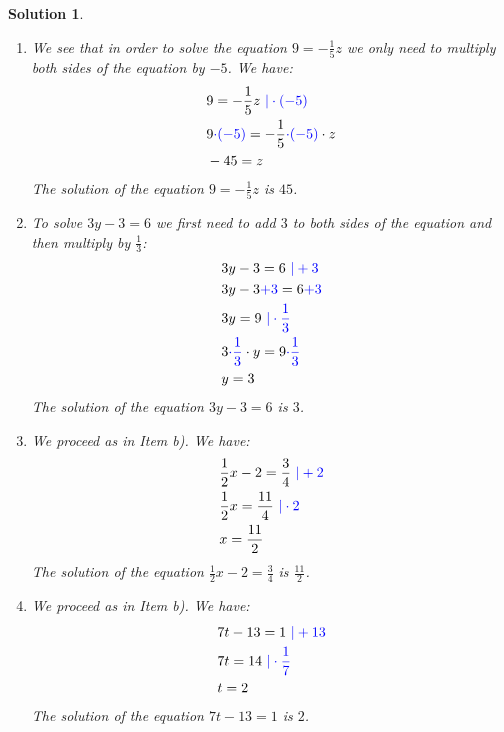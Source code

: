 \documentclass[12pt]{article}
\newtheorem{sol}[prop]{Solution}
\begin{document}
\begin{sol}
\begin{enumerate}
\item[a)] We see that in order to solve the equation $9=-\frac{1}{5}z$ we only need to multiply both sides of the equation by $-5$. We have:
\begin{equation*}
\begin{split}
& 9=-\frac{1}{5}z \textcolor{blue}{\ | \cdot (-5)}\\
& 9\textcolor{blue}{\cdot (-5)}=-\frac{1}{5}\textcolor{blue}{\cdot (-5)}\cdot z\\
& -45=z
\end{split}
\end{equation*}
The solution of the equation $9=-\frac{1}{5}z$ is $45$.
\item[b)] To solve $3y-3=6$ we first need to add $3$ to both sides of the equation and then multiply by $\frac{1}{3}$:
\begin{equation*}
\begin{split}
& 3y-3=6 \textcolor{blue}{\ | +3}\\
& 3y-3\textcolor{blue}{+3}=6\textcolor{blue}{+3}\\
& 3y=9\textcolor{blue}{\ | \cdot\frac{1}{3}}\\
& 3\textcolor{blue}{\cdot\frac{1}{3}}\cdot y=9\textcolor{blue}{\cdot\frac{1}{3}}\\
& y=3
\end{split}
\end{equation*}
The solution of the equation $3y-3=6$ is $3$.
\item[c)] We proceed as in Item b). We have:
\begin{equation*}
\begin{split}
& \frac{1}{2}x-2=\frac{3}{4} \textcolor{blue}{\ | +2}\\
& \frac{1}{2}x=\frac{11}{4}\textcolor{blue}{\ | \cdot 2}\\
& x=\frac{11}{2}
\end{split}
\end{equation*}
The solution of the equation $\frac{1}{2}x-2=\frac{3}{4}$ is $\frac{11}{2}$.
\item[(d)] We proceed as in Item b). We have:
\begin{equation*}
\begin{split}
&7t-13=1 \textcolor{blue}{\ | +13}\\
& 7t=14\textcolor{blue}{\ | \cdot \frac{1}{7}}\\
& t=2
\end{split}
\end{equation*}
The solution of the equation $7t-13=1$ is $2$.
\end{enumerate}
\end{sol}
\end{document}
